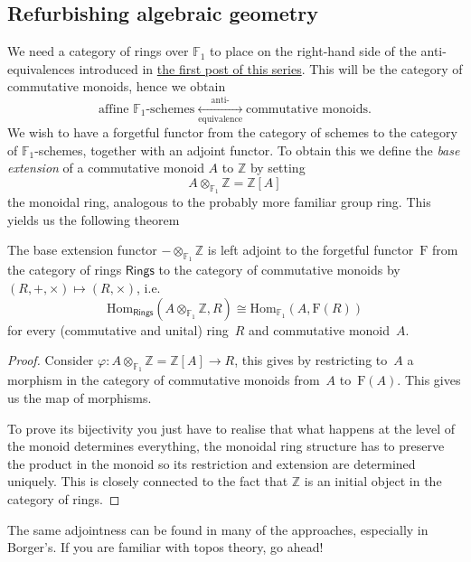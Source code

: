 \subsection{Refurbishing algebraic geometry}
We need a category of rings over $\mathbb{F}_1$ to place on the right-hand side of the anti-equivalences introduced in \href{http://www.noncommutative.org/index.php/series/la-carte-et-le-territoire-understanding-schemes-and-mathcalm-schemes}{the first post of this series}. This will be the category of commutative monoids, hence we obtain
\begin{equation}
  \label{equation:scheme-anti-equivalence}
  \text{affine $\mathbb{F}_1$-schemes} \underset{\text{equivalence}}{\overset{\text{anti-}}{\longleftrightarrow}} \text{commutative monoids}.
\end{equation}
We wish to have a forgetful functor from the category of schemes to the category of $\mathbb{F}_1$-schemes, together with an adjoint functor. To obtain this we define the \emph{base extension} of a commutative monoid $A$ to $\mathbb{Z}$ by setting
\begin{equation}
  A\otimes_{\mathbb{F}_1}\mathbb{Z}=\mathbb{Z}[A]
\end{equation}
the monoidal ring, analogous to the probably more familiar group ring. This yields us the following theorem
\begin{theorem}
  The base extension functor $-\otimes_{\mathbb{F}_1}\mathbb{Z}$ is left adjoint to the forgetful functor~$\mathrm{F}$ from the category of rings $\textsf{Rings}$ to the category of commutative monoids by $(R,+,\times)\mapsto(R,\times)$, i.e.
  \begin{equation}
    \mathrm{Hom}_{\textsf{Rings}}(A\otimes_{\mathbb{F}_1}\mathbb{Z},R)\cong\mathrm{Hom}_{\mathbb{F}_1}(A,\mathrm{F}(R))
  \end{equation}
  for every (commutative and unital) ring~$R$ and commutative monoid~$A$.

  \begin{proof}
    Consider $\varphi\colon A\otimes_{\mathbb{F}_1}\mathbb{Z}=\mathbb{Z}[A]\to R$, this gives by restricting to~$A$ a morphism in the category of commutative monoids from~$A$ to~$\mathrm{F}(A)$. This gives us the map of morphisms.
    
    To prove its bijectivity you just have to realise that what happens at the level of the monoid determines everything, the monoidal ring structure has to preserve the product in the monoid so its restriction and extension are determined uniquely. This is closely connected to the fact that $\mathbb{Z}$ is an initial object in the category of rings.
  \end{proof}
\end{theorem}
The same adjointness can be found in many of the approaches, especially in Borger's. If you are familiar with topos theory, go ahead!

